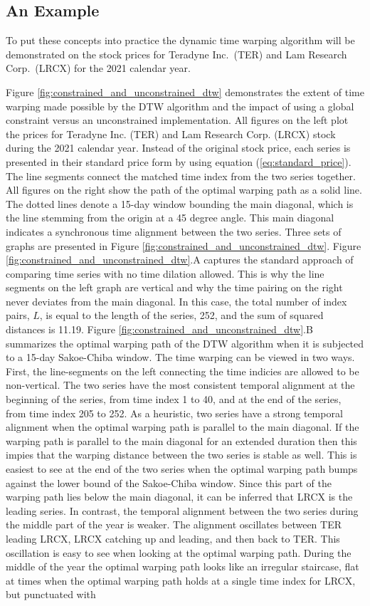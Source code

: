 \documentclass[12pt]{report}
\begin{document}
\subsection{An Example}

To put these concepts into practice the dynamic time warping algorithm will be demonstrated on the stock prices for Teradyne Inc.\ (TER) and Lam Research Corp.\ (LRCX) for the 2021 calendar year. 

Figure \ref{fig:constrained_and_unconstrained_dtw} demonstrates the extent of time warping made possible by the DTW algorithm and the impact of using a global constraint versus an unconstrained implementation. All figures on the left plot the prices for Teradyne Inc. (TER) and Lam Research Corp. (LRCX) stock during the 2021 calendar year. Instead of the original stock price, each series is presented in their standard price form by using equation (\ref{eq:standard_price}). The line segments connect the matched time index from the two series together. All figures on the right show the path of the optimal warping path as a solid line. The dotted lines denote a 15-day window bounding the main diagonal, which is the line stemming from the origin at a 45 degree angle. This main diagonal indicates a synchronous time alignment between the two series. Three sets of graphs are presented in Figure \ref{fig:constrained_and_unconstrained_dtw}. Figure \ref{fig:constrained_and_unconstrained_dtw}.A captures the standard approach of comparing time series with no time dilation allowed. This is why the line segments on the left graph are vertical and why the time pairing on the right never deviates from the main diagonal. In this case, the total number of index pairs, $L$, is equal to the length of the series, 252, and the sum of squared distances is 11.19. Figure \ref{fig:constrained_and_unconstrained_dtw}.B summarizes the optimal warping path of the DTW algorithm when it is subjected to a 15-day Sakoe-Chiba window. The time warping can be viewed in two ways. First, the line-segments on the left connecting the time indicies are allowed to be non-vertical. The two series have the most consistent temporal alignment at the beginning of the series, from time index 1 to 40, and at the end of the series, from time index 205 to 252. As a heuristic, two series have a strong temporal alignment when the optimal warping path is parallel to the main diagonal. If the warping path is parallel to the main diagonal for an extended duration then this impies that the warping distance between the two series is stable as well. This is easiest to see at the end of the two series when the optimal warping path bumps against the lower bound of the Sakoe-Chiba window. Since this part of the warping path lies below the main diagonal, it can be inferred that LRCX is the leading series. In contrast, the temporal alignment between the two series during the middle part of the year is weaker. The alignment oscillates between TER leading LRCX, LRCX catching up and leading, and then back to TER. This oscillation is easy to see when looking at the optimal warping path. During the middle of the year the optimal warping path looks like an irregular staircase, flat at times when the optimal warping path holds at a single time index for LRCX, but punctuated with 
\end{document}
